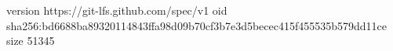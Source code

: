 version https://git-lfs.github.com/spec/v1
oid sha256:bd6688ba89320114843ffa98d09b70cf3b7e3d5becec415f455535b579dd11ce
size 51345
